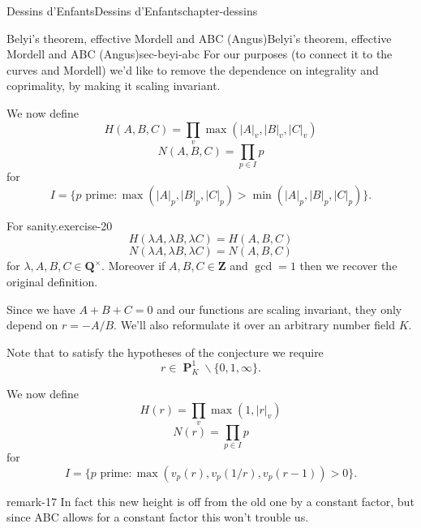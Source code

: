 \documentclass[oneside,10pt,]{book}
\numberwithin{equation}{section}
\newcommand{\units}{^{\times}}
\newcommand{\ZZ}{\mathbf{Z}}
\newcommand{\QQ}{\mathbf{Q}}
\DeclareMathOperator{\PP}{\mathbf{P}}
\newcommand{\gt}{>}
\begin{document}
\begin{chapterptx}{Dessins d'Enfants}{}{Dessins d'Enfants}{}{}{chapter-dessins}
\begin{sectionptx}{Belyi's theorem, effective Mordell and ABC (Angus)}{}{Belyi's theorem, effective Mordell and ABC (Angus)}{}{}{sec-beyi-abc}
\hypertarget{p-673}{}%
For our purposes (to connect it to the curves and Mordell) we'd like to remove the dependence on integrality and coprimality, by making it scaling invariant.%
\par
\hypertarget{p-674}{}%
We now define%
\begin{equation*}
H(A,B,C) = \prod_{v}\max(|A|_v,|B|_v,|C|_v)
\end{equation*}
%
\begin{equation*}
N(A,B,C) =  \prod_{p\in I} p
\end{equation*}
for%
\begin{equation*}
I = \{p \text{ prime} : \max(|A|_p,|B|_p,|C|_p) \gt \min(|A|_p,|B|_p,|C|_p)\}\text{.}
\end{equation*}
%
\begin{inlineexercise}{For sanity.}{exercise-20}%
\hypertarget{p-675}{}%
%
\begin{equation*}
H(\lambda A,\lambda B,\lambda C)  = H(A,B,C)
\end{equation*}
%
\begin{equation*}
N(\lambda A,\lambda B,\lambda C)  = N(A,B,C)
\end{equation*}
for \(\lambda, A,B,C \in \QQ\units\). Moreover if \(A,B,C \in \ZZ\) and \(\gcd = 1\) then we recover the original definition.%
\end{inlineexercise}
\hypertarget{p-676}{}%
Since we have \(A+ B+C = 0\) and our functions are scaling invariant, they only depend on \(r=  - A/B\). We'll also reformulate it over an arbitrary number field \(K\).%
\par
\hypertarget{p-677}{}%
Note that to satisfy the hypotheses of the conjecture we require%
\begin{equation*}
r \in \PP^1_K \smallsetminus \{0,1,\infty\}\text{.}
\end{equation*}
%
\par
\hypertarget{p-678}{}%
We now define%
\begin{equation*}
H(r) = \prod_{v}\max(1,|r|_v)
\end{equation*}
%
\begin{equation*}
N(r) =  \prod_{p\in I} p
\end{equation*}
for%
\begin{equation*}
I = \{p \text{ prime} : \max(v_p(r), v_p(1/r), v_p(r-1)) \gt 0                      \}\text{.}
\end{equation*}
%
\begin{remark}{}{remark-17}%
\hypertarget{p-679}{}%
In fact this new height is off from the old one by a constant factor, but since ABC allows for a constant factor this won't trouble us.%

\end{remark}
\end{sectionptx}
\end{chapterptx}
\end{document}
